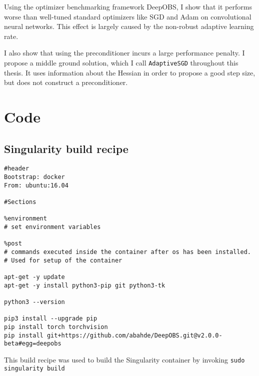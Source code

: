 \documentclass[twoside,12pt,a4paper]{report}
\begin{document}
Using the optimizer benchmarking framework DeepOBS, I show that it performs worse than well-tuned standard optimizers like SGD and Adam on convolutional neural networks. This effect is largely caused by the non-robust adaptive learning rate.

 I also show that using the preconditioner incurs a large performance penalty. I propose a middle ground solution, which I call \verb|AdaptiveSGD| throughout this thesis. It uses information about the Hessian in order to propose a good step size, but does not construct a preconditioner.


\appendix %
\chapter{Code}
\section{Singularity build recipe}
\begin{verbatim}
#header
Bootstrap: docker
From: ubuntu:16.04

#Sections

%environment
# set environment variables

%post
# commands executed inside the container after os has been installed.
# Used for setup of the container

apt-get -y update
apt-get -y install python3-pip git python3-tk

python3 --version

pip3 install --upgrade pip
pip install torch torchvision
pip install git+https://github.com/abahde/DeepOBS.git@v2.0.0-beta#egg=deepobs

\end{verbatim}
This build recipe was used to build the Singularity container by invoking \verb|sudo singularity build|
\end{document}
